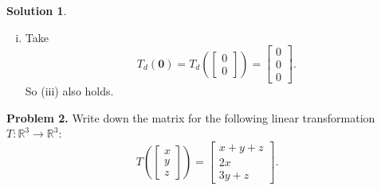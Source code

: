 \documentclass[12pt]{report} %
\newcommand{\R}{\mathbb{R}}
\theoremstyle{definition}
\newtheorem{solution}{Solution}
\begin{document}
\begin{solution}
\begin{enumerate}[(a)]
\begin{enumerate}[(i)]
        \item Take
        \[
        T_d(\mathbf{0})=T_d\left( \begin{bmatrix} 0\\0\end{bmatrix}\right) = \begin{bmatrix} 0\\0\\0\end{bmatrix}.
        \]
        So (iii) also holds.
    \end{enumerate}
\end{enumerate}
\end{solution}

\noindent\textbf{Problem 2.} Write down the matrix for the following linear transformation $T\colon \R^3 \to \R^3$:
\[
T\left( \begin{bmatrix} x\\ y\\ z \end{bmatrix}\right)
= \begin{bmatrix} x+y+z\\ 2x\\ 3y + z \end{bmatrix}.
\]
\end{document}
